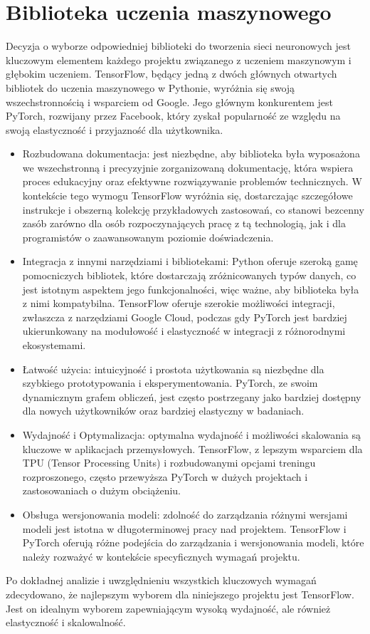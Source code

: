 \documentclass[a4paper,twoside,12pt]{book}
\begin{document}
\section{Biblioteka uczenia maszynowego}

Decyzja o wyborze odpowiedniej biblioteki do tworzenia sieci neuronowych jest kluczowym elementem każdego projektu związanego z uczeniem maszynowym i głębokim uczeniem. TensorFlow, będący jedną z dwóch głównych otwartych bibliotek do uczenia maszynowego w Pythonie, wyróżnia się swoją wszechstronnością i wsparciem od Google. Jego głównym konkurentem jest PyTorch, rozwijany przez Facebook, który zyskał popularność ze względu na swoją elastyczność i przyjazność dla użytkownika.
\begin{itemize}
  \item Rozbudowana dokumentacja: jest niezbędne, aby biblioteka była wyposażona we wszechstronną i precyzyjnie zorganizowaną dokumentację, która wspiera proces edukacyjny oraz efektywne rozwiązywanie problemów technicznych. W kontekście tego wymogu TensorFlow wyróżnia się, dostarczając szczegółowe instrukcje i obszerną kolekcję przykładowych zastosowań, co stanowi bezcenny zasób zarówno dla osób rozpoczynających pracę z tą technologią, jak i dla programistów o zaawansowanym poziomie doświadczenia.
  \item Integracja z innymi narzędziami i bibliotekami: Python oferuje szeroką gamę pomocniczych bibliotek, które dostarczają zróżnicowanych typów danych, co jest istotnym aspektem jego funkcjonalności, więc ważne, aby biblioteka była z nimi kompatybilna. TensorFlow oferuje szerokie możliwości integracji, zwłaszcza z narzędziami Google Cloud\cite{bib:COLAB}, podczas gdy PyTorch jest bardziej ukierunkowany na modułowość i elastyczność w integracji z różnorodnymi ekosystemami.
  \item Łatwość użycia: intuicyjność i prostota użytkowania są niezbędne dla szybkiego prototypowania i eksperymentowania. PyTorch, ze swoim dynamicznym grafem obliczeń, jest często postrzegany jako bardziej dostępny dla nowych użytkowników oraz bardziej elastyczny w badaniach.
  \item Wydajność i Optymalizacja: optymalna wydajność i możliwości skalowania są kluczowe w aplikacjach przemysłowych. TensorFlow, z lepszym wsparciem dla TPU (Tensor Processing Units)\cite{bib:TPU} i rozbudowanymi opcjami treningu rozproszonego, często przewyższa PyTorch w dużych projektach i zastosowaniach o dużym obciążeniu.
  \item Obsługa wersjonowania modeli: zdolność do zarządzania różnymi wersjami modeli jest istotna w długoterminowej pracy nad projektem. TensorFlow i PyTorch oferują różne podejścia do zarządzania i wersjonowania modeli, które należy rozważyć w kontekście specyficznych wymagań projektu.
\end{itemize}
Po dokładnej analizie i uwzględnieniu wszystkich kluczowych wymagań zdecydowano, że najlepszym wyborem dla niniejszego projektu jest TensorFlow. Jest on idealnym wyborem zapewniającym wysoką wydajność, ale również elastyczność i skalowalność.
\end{document}
